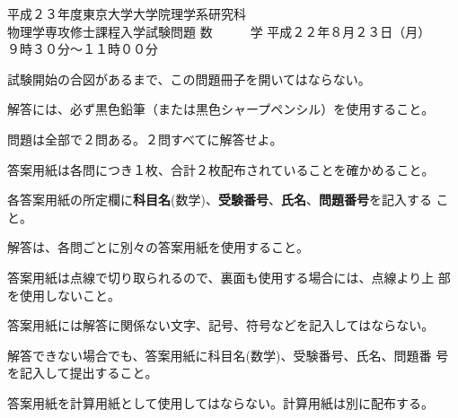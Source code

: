 \begin{inshicover}%
  {平成２３年度東京大学大学院理学系研究科\\物理学専攻修士課程入学試験問題}%
  {数　　　学}%
  {平成２２年８月２３日（月）　　９時３０分〜１１時００分}
\item 試験開始の合図があるまで、この問題冊子を開いてはならない。
\item 解答には、必ず黒色鉛筆（または黒色シャープペンシル）を使用すること。
\item 問題は全部で２問ある。２問すべてに解答せよ。
\item 答案用紙は各問につき１枚、合計２枚配布されていることを確かめること。
\item 各答案用紙の所定欄に{\bf 科目名}(数学)、{\bf 受験番号}、{\bf 氏名}、{\bf 問題番号}を記入する
      こと。
\item 解答は、各問ごとに別々の答案用紙を使用すること。
\item 答案用紙は点線で切り取られるので、裏面も使用する場合には、点線より上
      部を使用しないこと。
\item 答案用紙には解答に関係ない文字、記号、符号などを記入してはならない。
\item 解答できない場合でも、答案用紙に科目名(数学)、受験番号、氏名、問題番
      号を記入して提出すること。
\item 答案用紙を計算用紙として使用してはならない。計算用紙は別に配布する。
\end{inshicover}
